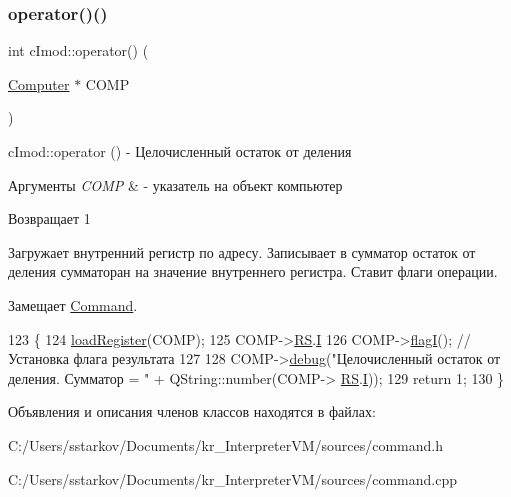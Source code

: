 \subsubsection{\texorpdfstring{operator()()}{operator()()}}
{\footnotesize\ttfamily int c\+Imod\+::operator() (\begin{DoxyParamCaption}\item[{\hyperlink{class_computer}{Computer} $\ast$}]{C\+O\+MP }\end{DoxyParamCaption})\hspace{0.3cm}{\ttfamily [virtual]}}



c\+Imod\+::operator () -\/ Целочисленный остаток от деления 


\begin{DoxyParams}{Аргументы}
{\em C\+O\+MP} & -\/ указатель на объект компьютер \\
\hline
\end{DoxyParams}
\begin{DoxyReturn}{Возвращает}
1
\end{DoxyReturn}
Загружает внутренний регистр по адресу. Записывает в сумматор остаток от деления сумматоран на значение внутреннего регистра. Ставит флаги операции. 

Замещает \hyperlink{class_command_a79939b66f3de892e91d7710844294716}{Command}.


\begin{DoxyCode}
123 \{
124     \hyperlink{class_command_aac6f368e7c9dbb357b3f00627d5dabfc}{loadRegister}(COMP);
125     COMP->\hyperlink{class_computer_a874503110664b3cf821118d2ce9c2b96}{RS}.\hyperlink{union_computer_1_1data_a6e51de6e0351adc4e50b336a092bc4bb}{I} %
126     COMP->\hyperlink{class_computer_aae4a76a8a03a6c9fb1c12968d629be3e}{flagI}(); \textcolor{comment}{//Установка флага результата}
127 
128     COMP->\hyperlink{class_computer_a10ca6c6b200630119201de16d7368e0f}{debug}(\textcolor{stringliteral}{"Целочисленный остаток от деления. Сумматор = "} + QString::number(COMP->
      \hyperlink{class_computer_a874503110664b3cf821118d2ce9c2b96}{RS}.\hyperlink{union_computer_1_1data_a6e51de6e0351adc4e50b336a092bc4bb}{I}));
129     \textcolor{keywordflow}{return} 1;
130 \}
\end{DoxyCode}


Объявления и описания членов классов находятся в файлах\+:\begin{DoxyCompactItemize}
\item 
C\+:/\+Users/sstarkov/\+Documents/kr\+\_\+\+Interpreter\+V\+M/sources/command.\+h\item 
C\+:/\+Users/sstarkov/\+Documents/kr\+\_\+\+Interpreter\+V\+M/sources/command.\+cpp\end{DoxyCompactItemize}
